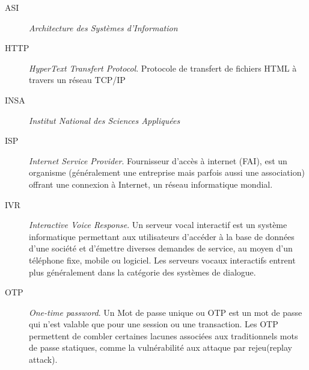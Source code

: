 \documentclass[a4paper,french,12pt]{report}
\begin{document}
\begin{description}
	\item[ASI] \textsl{Architecture des Systèmes d’Information}
        \item[HTTP] \textsl{HyperText Transfert Protocol}. Protocole de transfert de fichiers HTML à travers un réseau TCP/IP
        \item[INSA] \textsl{Institut National des Sciences Appliquées}
	\item[ISP] \textsl{Internet Service Provider}. Fournisseur d'accès à internet (FAI), est un organisme (généralement une entreprise mais parfois aussi une association) offrant une connexion à Internet, un réseau informatique mondial.
	\item[IVR] \textsl{Interactive Voice Response}. Un serveur vocal interactif est un système informatique permettant aux utilisateurs d'accéder à la base de données d'une société et d'émettre diverses demandes de service, au moyen d'un téléphone fixe, mobile ou logiciel. Les serveurs vocaux interactifs entrent plus généralement dans la catégorie des systèmes de dialogue.
	\item[OTP] \textsl{One-time password}. Un Mot de passe unique ou OTP est un mot de passe qui n'est valable que pour une session ou une transaction. Les OTP permettent de combler certaines lacunes associées aux traditionnels mots de passe statiques, comme la vulnérabilité aux attaque par rejeu(replay attack).

\end{description}
\end{document}
